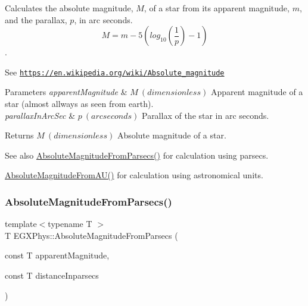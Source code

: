 Calculates the absolute magnitude, $M$, of a star from its apparent magnitude, $m$, and the parallax, $p$, in arc seconds. \[M= m - 5 \left ( log_{10} \left ( \dfrac{1}{p} \right ) - 1 \right )\]. 

See \href{https://en.wikipedia.org/wiki/Absolute_magnitude}{\tt https\+://en.\+wikipedia.\+org/wiki/\+Absolute\+\_\+magnitude}


\begin{DoxyParams}{Parameters}
{\em apparent\+Magnitude} & $M\ (dimensionless)$ Apparent magnitude of a star (almost allways as seen from earth). \\
\hline
{\em parallax\+In\+Arc\+Sec} & $p\ (arc seconds)$ Parallax of the star in arc seconds. \\
\hline
\end{DoxyParams}
\begin{DoxyReturn}{Returns}
$M\ (dimensionless)$ Absolute magnitude of a star. 
\end{DoxyReturn}
\begin{DoxySeeAlso}{See also}
\mbox{\hyperlink{group___e_g_x_phys-_astrophysics-_absolute_magnitude_ga6eb3d93ce8d6ff1e0cc288059225ff9a}{Absolute\+Magnitude\+From\+Parsecs()}} for calculation using parsecs. 

\mbox{\hyperlink{group___e_g_x_phys-_astrophysics-_absolute_magnitude_gab25029a422f98bc7f8cea59abce3860e}{Absolute\+Magnitude\+From\+A\+U()}} for calculation using astronomical units. 
\end{DoxySeeAlso}
\mbox{\label{group___e_g_x_phys-_astrophysics-_absolute_magnitude_ga6eb3d93ce8d6ff1e0cc288059225ff9a}} 
\subsubsection{\texorpdfstring{Absolute\+Magnitude\+From\+Parsecs()}{AbsoluteMagnitudeFromParsecs()}}
{\footnotesize\ttfamily template$<$typename T $>$ \\
T E\+G\+X\+Phys\+::\+Absolute\+Magnitude\+From\+Parsecs (\begin{DoxyParamCaption}\item[{const T}]{apparent\+Magnitude,  }\item[{const T}]{distance\+Inparsecs }\end{DoxyParamCaption})}



